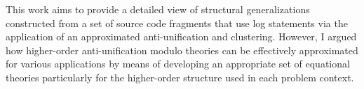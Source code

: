 This work aims to provide a detailed view of structural generalizations constructed from a set of source code fragments that use log statements via the application of an approximated anti-unification and clustering. However, I argued how higher-order anti-unification modulo theories can be effectively approximated for various applications by means of developing an appropriate set of equational theories particularly for the higher-order structure used in each problem context. 

